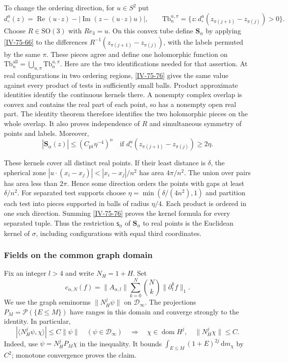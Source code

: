 \documentclass[11pt,letterpaper,reqno]{amsart}
\theoremstyle{definition}
\theoremstyle{remark}
\begin{document}
To change the ordering direction, for $u\in S^2$ put
\[
 d_\circ^u(z)=\operatorname{Re}(u\cdot z)
       -|\operatorname{Im}(z-(u\cdot z)u)|,
 \qquad
 \mathrm{Tb}^{u,\pi}_n=
 \{z:d_\circ^u(z_{\pi(j+1)}-z_{\pi(j)})>0\}.
\]
Choose $R\in\mathrm{SO}(3)$ with $Re_3=u$. On this convex
tube define $\mathbf S_{\underline\alpha}$ by applying
\eqref{IV-75-66} to the differences
$R^{-1}(z_{\pi(j+1)}-z_{\pi(j)})$, with the labels permuted
by the same $\pi$. These pieces agree and define one
holomorphic function on $\mathrm{Tb}^{\mathrm{all}}_n
=\bigcup_{u,\pi}\mathrm{Tb}^{u,\pi}_n$.
Here are the two identifications needed for that assertion.
At real configurations in two ordering regions,
\eqref{IV-75-76} gives the same value against every product of
tests in sufficiently small balls. Product approximate
identities identify the continuous kernels there. A nonempty
complex overlap is convex and contains the real part of each
point, so has a nonempty open real part. The identity theorem
therefore identifies the two holomorphic pieces on the whole
overlap. It also proves independence of $R$ and simultaneous
symmetry of points and labels. Moreover,
\begin{equation}\label{IV-75-85}
 |\mathbf S_{\underline\alpha}(z)|
       \le(C_{\mathrm{pt}}\eta^{-4})^n
 \quad\text{if }d_\circ^u(z_{\pi(j+1)}-z_{\pi(j)})\ge2\eta.
\end{equation}

These kernels cover all distinct real points. If their least
distance is $\delta$, the spherical zone
$|u\cdot(x_i-x_j)|<|x_i-x_j|/n^2$ has area $4\pi/n^2$.
The union over pairs has area less than $2\pi$. Hence some
direction orders the points with gaps at least $\delta/n^2$.
For separated test supports choose
$\eta=\min(\delta/(4n^2),1)$ and partition each test into
pieces supported in balls of radius $\eta/4$.
Each product is ordered in one such direction. Summing
\eqref{IV-75-76} proves the kernel formula for every separated
tuple. Thus the restriction $\mathsf s_{\underline\alpha}$ of
$\mathbf S_{\underline\alpha}$ to real points is the
Euclidean kernel of $\sigma$, including configurations with
equal third coordinates.

\subsubsection{Fields on the common graph domain}

Fix an integer $l>4$ and write $N_H=1+H$. Set
\[
 c_{\alpha,N}(f)=\|A_{\alpha,l}\|
                 \sum_{k=0}^N\binom Nk\|\partial_t^kf\|_1.
\]
We use the graph seminorms $\|N_H^j\psi\|$ on
$\mathcal D_\infty$. The projections
$P_M=\mathcal P(\{E\le M\})$ have ranges in this domain and
converge strongly to the identity. In particular,
\begin{equation}\label{eq:iv-domain-criterion}
 |\langle N_H^j\psi,\chi\rangle|\le C\|\psi\|
 \quad(\psi\in\mathcal D_\infty)
 \quad\Longrightarrow\quad
 \chi\in\operatorname{dom}H^j,\quad\|N_H^j\chi\|\le C.
\end{equation}
Indeed, use $\psi=N_H^jP_M\chi$ in the inequality. It bounds
$\int_{E\le M}(1+E)^{2j}\,\mathrm{d}m_\chi$ by $C^2$;
monotone convergence proves the claim.
\end{document}
